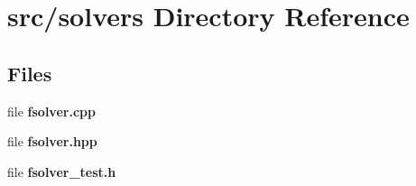 \section{src/solvers Directory Reference}
\label{dir_19373f467389307dc54ab8a6e9e19559}
\subsection*{Files}
\begin{DoxyCompactItemize}
\item 
file {\bfseries fsolver.\-cpp}
\item 
file {\bfseries fsolver.\-hpp}
\item 
file {\bfseries fsolver\-\_\-test.\-h}
\end{DoxyCompactItemize}
